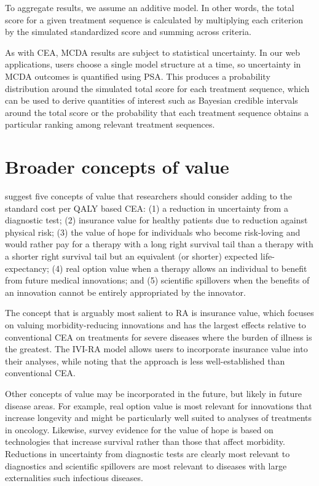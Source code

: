 \documentclass[11pt,final,fleqn]{article}
\theoremstyle{plain}
\begin{document}
To aggregate results, we assume an additive model. In other words, the total score for a given treatment sequence is calculated by multiplying each criterion by the simulated standardized score and summing across criteria.

As with CEA, MCDA results are subject to statistical uncertainty. In our web applications, users choose a single model structure at a time, so uncertainty in MCDA outcomes is quantified using PSA. This produces a probability distribution around the simulated total score for each treatment sequence, which can be used to derive quantities of interest such as Bayesian credible intervals around the total score or the probability that each treatment sequence obtains a particular ranking among relevant treatment sequences.

\section{Broader concepts of value}\label{sec:braoder-value}
\citet{garrison2017toward} suggest five concepts of value that researchers should consider adding to the standard cost per QALY based CEA: (1) a reduction in uncertainty from a diagnostic test; (2) insurance value for healthy patients due to reduction against physical risk; (3) the value of hope for individuals who become risk-loving and would rather pay for a therapy with a long right survival tail than a therapy with a shorter right survival tail but an equivalent (or shorter) expected life-expectancy; (4) real option value when a therapy allows an individual to benefit from future medical innovations; and (5) scientific spillovers when the benefits of an innovation cannot be entirely appropriated by the innovator. 

The concept that is arguably most salient to RA is insurance value, which focuses on valuing morbidity-reducing innovations and has the largest effects relative to conventional CEA on treatments for severe diseases where the burden of illness is the greatest. The IVI-RA model allows users to incorporate insurance value into their analyses, while noting that the approach is less well-established than conventional CEA. 

Other concepts of value may be incorporated in the future, but likely in future disease areas. For example, real option value is most relevant for innovations that increase longevity and might be particularly well suited to analyses of treatments in oncology. Likewise, survey evidence for the value of hope is based on technologies that increase survival \citet{lakdawalla2012cancer} rather than those that affect morbidity. Reductions in uncertainty from diagnostic tests are clearly most relevant to diagnostics and scientific spillovers are most relevant to diseases with large externalities such infectious diseases. 
\end{document}
